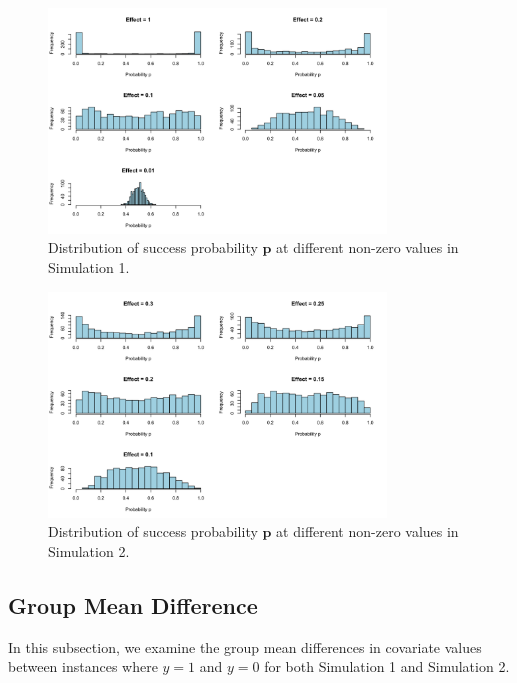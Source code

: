 \documentclass[12pt]{article}
\begin{document}
\begin{figure}[h!]
	\centering
	\includegraphics[width=0.8\textwidth]{sim1_p_dist.png}
  \caption{Distribution of success probability \( \mathbf{p} \) at different non-zero values in Simulation 1.}
	\label{fig:sim1_p_dist}
\end{figure}

\begin{figure}[h!]
	\centering
	\includegraphics[width=0.8\textwidth]{sim2_p_dist.png}
  \caption{Distribution of success probability \( \mathbf{p} \) at different non-zero values in Simulation 2.}
	\label{fig:sim2_p_dist}
\end{figure}

\FloatBarrier

\subsection*{Group Mean Difference}

In this subsection, we examine the group mean differences in covariate values between instances where \( y = 1 \) and \( y = 0 \) for both Simulation 1 and Simulation 2.
\end{document}
